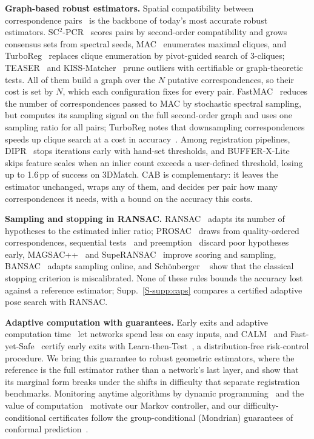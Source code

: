 \documentclass[10pt,twocolumn,letterpaper]{article}
\newcommand{\pp}{\,pp\xspace}
\newcommand{\method}{CAB\xspace}
\newcommand{\SCP}{SC$^2$-PCR\xspace}
\newcommand{\paragraphb}[1]{\vspace{2pt}\noindent\textbf{#1}\hspace{0.4em}}
\newcommand{\suppref}[1]{Supp.~\ref{S-#1}}
\begin{document}
\paragraphb{Graph-based robust estimators.}
Spatial compatibility between correspondence pairs~\cite{bai2021pointdsc} is the backbone of today's most accurate robust estimators.
\SCP~\cite{chen2022sc2pcr} scores pairs by second-order compatibility and grows consensus sets from spectral seeds, MAC~\cite{zhang2023mac} enumerates maximal cliques, and TurboReg~\cite{yan2025turboreg} replaces clique enumeration by pivot-guided search of 3-cliques; TEASER~\cite{yang2020teaser} and KISS-Matcher~\cite{lim2025kissmatcher} prune outliers with certifiable or graph-theoretic tests.
All of them build a graph over the $N$ putative correspondences, so their cost is set by $N$, which each configuration fixes for every pair.
FastMAC~\cite{zhang2024fastmac} reduces the number of correspondences passed to MAC by stochastic spectral sampling, but computes its sampling signal on the full second-order graph and uses one sampling ratio for all pairs; TurboReg notes that downsampling correspondences speeds up clique search at a cost in accuracy~\cite{yan2025turboreg}.
Among registration pipelines, DIPR~\cite{ai2023dipr} stops iterations early with hand-set thresholds, and BUFFER-X-Lite~\cite{lim2026bufferxlite} skips feature scales when an inlier count exceeds a user-defined threshold, losing up to 1.6\pp of success on 3DMatch.
\method is complementary: it leaves the estimator unchanged, wraps any of them, and decides per pair how many correspondences it needs, with a bound on the accuracy this costs.

\paragraphb{Sampling and stopping in RANSAC.}
RANSAC~\cite{fischler1981ransac} adapts its number of hypotheses to the estimated inlier ratio; PROSAC~\cite{chum2005prosac} draws from quality-ordered correspondences, sequential tests~\cite{matas2005sprt} and preemption~\cite{nister2003preemptive} discard poor hypotheses early, MAGSAC++~\cite{barath2020magsacpp} and SupeRANSAC~\cite{barath2025superansac} improve scoring and sampling, BANSAC~\cite{piedade2023bansac} adapts sampling online, and Sch\"onberger \etal~\cite{schonberger2025fixing} show that the classical stopping criterion is miscalibrated.
None of these rules bounds the accuracy lost against a reference estimator; \suppref{supp:caps} compares a certified adaptive pose search with RANSAC.

\paragraphb{Adaptive computation with guarantees.}
Early exits and adaptive computation time~\cite{graves2016act,teerapittayanon2016branchynet} let networks spend less on easy inputs, and CALM~\cite{schuster2022calm} and Fast-yet-Safe~\cite{jazbec2024fastyetsafe} certify early exits with Learn-then-Test~\cite{angelopoulos2021ltt}, a distribution-free risk-control procedure.
We bring this guarantee to robust geometric estimators, where the reference is the full estimator rather than a network's last layer, and show that its marginal form breaks under the shifts in difficulty that separate registration benchmarks.
Monitoring anytime algorithms by dynamic programming~\cite{hansen2001monitoring} and the value of computation~\cite{russell1991right} motivate our Markov controller, and our difficulty-conditional certificates follow the group-conditional (Mondrian) guarantees of conformal prediction~\cite{vovk2005alrw}.
\end{document}
